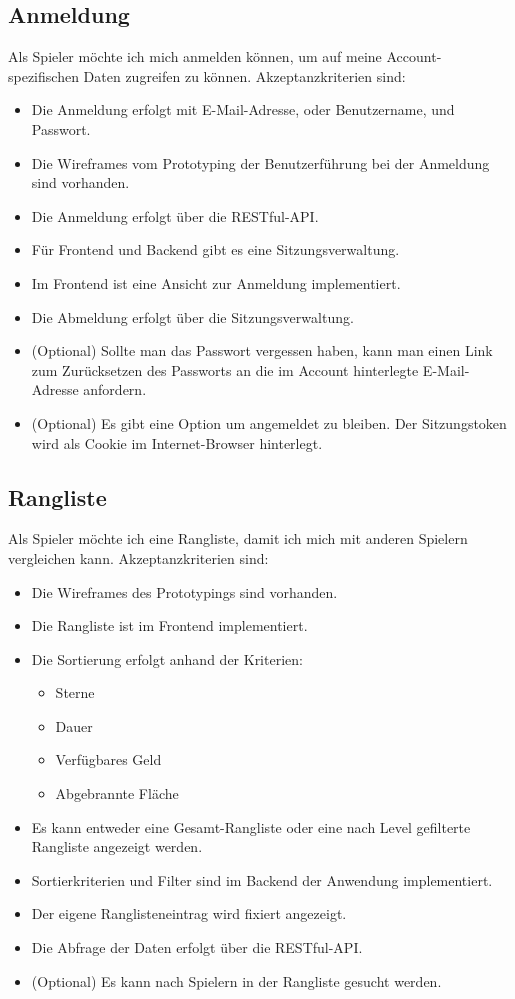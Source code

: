 \documentclass[letterpaper, 10 pt, conference]{ieeeconf}
\begin{document}
\subsection{Anmeldung}

Als Spieler möchte ich mich anmelden können,  um auf meine Account-spezifischen Daten zugreifen zu können.  Akzeptanzkriterien sind:
\begin{itemize}
\item Die Anmeldung erfolgt mit E-Mail-Adresse,  oder Benutzername, und Passwort.
\item Die Wireframes vom Prototyping der Benutzerführung bei der Anmeldung sind vorhanden.
\item Die Anmeldung erfolgt über die RESTful-API.
\item Für Frontend und Backend gibt es eine Sitzungsverwaltung.
\item Im Frontend ist eine Ansicht zur Anmeldung implementiert.
\item Die Abmeldung erfolgt über die Sitzungsverwaltung.
\item (Optional) Sollte man das Passwort vergessen haben, kann man einen Link zum Zurücksetzen des Passworts an die im Account hinterlegte E-Mail-Adresse anfordern.
\item (Optional) Es gibt eine Option um angemeldet zu bleiben.  Der Sitzungstoken wird als Cookie im Internet-Browser hinterlegt.
\end{itemize}

\subsection{Rangliste}

Als Spieler möchte ich eine Rangliste,  damit ich mich mit anderen Spielern vergleichen kann.  Akzeptanzkriterien sind:
\begin{itemize}
\item Die Wireframes des Prototypings sind vorhanden.
\item Die Rangliste ist im Frontend implementiert.
\item Die Sortierung erfolgt anhand der Kriterien:
\begin{itemize}
\item Sterne
\item Dauer
\item Verfügbares Geld
\item Abgebrannte Fläche
\end{itemize}
\item Es kann entweder eine Gesamt-Rangliste oder eine nach Level gefilterte Rangliste angezeigt werden.
\item Sortierkriterien und Filter sind im Backend der Anwendung implementiert.
\item Der eigene Ranglisteneintrag wird fixiert angezeigt.
\item Die Abfrage der Daten erfolgt über die RESTful-API.
\item (Optional) Es kann nach Spielern in der Rangliste gesucht werden.
\end{itemize}
\end{document}
